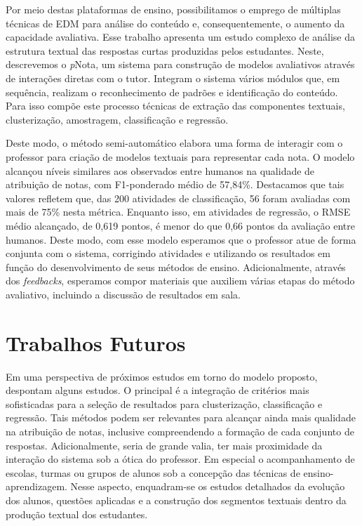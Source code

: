 Por meio destas plataformas de ensino, possibilitamos o emprego de múltiplas técnicas de EDM para análise do conteúdo e, consequentemente, o aumento da capacidade avaliativa. Esse trabalho apresenta um estudo complexo de análise da estrutura textual das respostas curtas produzidas pelos estudantes. Neste, descrevemos o \textit{p}Nota, um sistema para construção de modelos avaliativos através de interações diretas com o tutor. Integram o sistema vários módulos que, em sequência, realizam o reconhecimento de padrões e identificação do conteúdo. Para isso compõe este processo técnicas de extração das componentes textuais, clusterização, amostragem, classificação e regressão.

Deste modo, o método semi-automático elabora uma forma de interagir com o professor para criação de modelos textuais para representar cada nota. O modelo alcançou níveis similares aos observados entre humanos na qualidade de atribuição de notas, com F1-ponderado médio de 57,84\%. Destacamos que tais valores refletem que, das 200 atividades de classificação, 56 foram avaliadas com mais de 75\% nesta métrica. Enquanto isso, em atividades de regressão, o RMSE médio alcançado, de 0,619 pontos, é menor do que 0,66 pontos da avaliação entre humanos. Deste modo, com esse modelo esperamos que o professor atue de forma conjunta com o sistema, corrigindo atividades e utilizando os resultados em função do desenvolvimento de seus métodos de ensino. Adicionalmente, através dos \textit{feedbacks}, esperamos compor materiais que auxiliem várias etapas do método avaliativo, incluindo a discussão de resultados em sala.

\section{Trabalhos Futuros}

Em uma perspectiva de próximos estudos em torno do modelo proposto, despontam alguns estudos. O principal é a integração de critérios mais sofisticadas para a seleção de resultados para clusterização, classificação e regressão. Tais métodos podem ser relevantes para alcançar ainda mais qualidade na atribuição de notas, inclusive compreendendo a formação de cada conjunto de respostas. Adicionalmente, seria de grande valia, ter mais proximidade da interação do sistema sob a ótica do professor. Em especial o acompanhamento de escolas, turmas ou grupos de alunos sob a concepção das técnicas de ensino-aprendizagem. Nesse aspecto, enquadram-se os estudos detalhados da evolução dos alunos, questões aplicadas e a construção dos segmentos textuais dentro da produção textual dos estudantes.